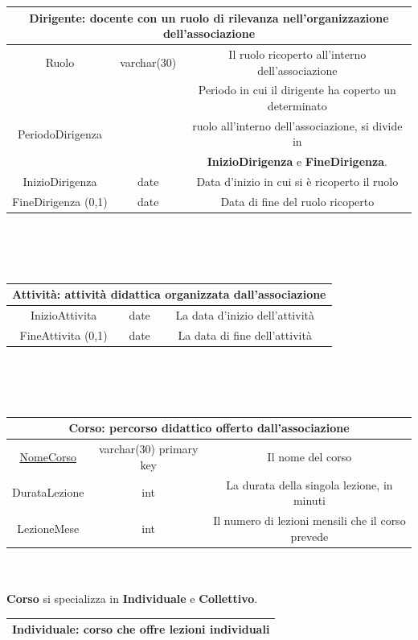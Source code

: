 \documentclass[11pt]{article}
\begin{document}
		\begin{tabular}{|c|c|c|}
			\hline
			\multicolumn{3}{|c|}{\textbf{Dirigente}: docente con un ruolo di rilevanza nell'organizzazione dell'associazione}\\
			\hline
			Ruolo & varchar(30) & Il ruolo ricoperto all'interno dell'associazione\\
			\hline
			&  & Periodo in cui il dirigente ha coperto un determinato\\
			PeriodoDirigenza &  & ruolo all'interno dell'associazione, si divide in\\
			&  &\textbf{InizioDirigenza} e \textbf{FineDirigenza}.\\
			InizioDirigenza & date & Data d'inizio in cui si è ricoperto il ruolo\\
			FineDirigenza (0,1) & date & Data di fine del ruolo ricoperto\\
			\hline
		\end{tabular}
		\\\\\\
		\begin{tabular}{|c|c|c|}
			\hline
			\multicolumn{3}{|c|}{\textbf{Attività}: attività didattica organizzata dall'associazione}\\
			\hline
			InizioAttivita & date & La data d'inizio dell'attività\\
			\hline
			FineAttivita (0,1) & date & La data di fine dell'attività\\
			\hline
		\end{tabular}
		\\\\\\
		\begin{tabular}{|c|c|c|}
			\hline
			\multicolumn{3}{|c|}{\textbf{Corso}: percorso didattico offerto dall'associazione}\\
			\hline
			\underline{NomeCorso} & varchar(30) primary key & Il nome del corso\\
			\hline
			DurataLezione & int & La durata della singola lezione, in minuti\\
			\hline
			LezioneMese & int & Il numero di lezioni mensili che il corso prevede\\
			\hline
		\end{tabular}
		\\\\ \textbf{Corso} si specializza in \textbf{Individuale} e \textbf{Collettivo}.\\
		\begin{tabular}{|c|c|c|}
			\hline
			\multicolumn{3}{|c|}{\textbf{Individuale}: corso che offre lezioni individuali}\\
			\hline
		\end{tabular}
\end{document}
